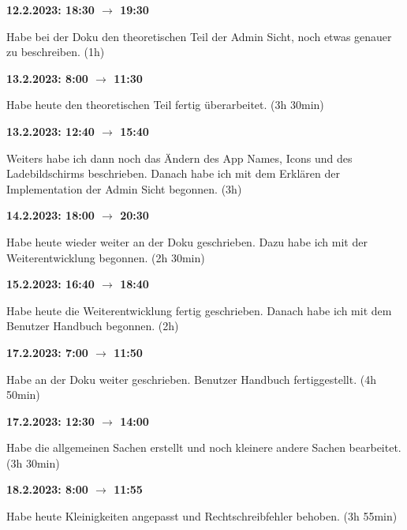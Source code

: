 \vspace{0.5cm}

\textbf{12.2.2023: 18:30 $\rightarrow$ 19:30} \

Habe bei der Doku den theoretischen Teil der Admin Sicht, noch etwas genauer zu beschreiben. (1h)

\vspace{0.5cm}

\textbf{13.2.2023: 8:00 $\rightarrow$ 11:30} \

Habe heute den theoretischen Teil fertig überarbeitet. (3h 30min)

\vspace{0.5cm}

\textbf{13.2.2023: 12:40 $\rightarrow$ 15:40} \

Weiters habe ich dann noch das Ändern des App Names, Icons und des Ladebildschirms beschrieben. Danach habe ich mit dem Erklären der Implementation der Admin Sicht begonnen. (3h)

\vspace{0.5cm}

\textbf{14.2.2023: 18:00 $\rightarrow$ 20:30} \

Habe heute wieder weiter an der Doku geschrieben. Dazu habe ich mit der Weiterentwicklung begonnen. (2h 30min)

\vspace{0.5cm}

\textbf{15.2.2023: 16:40 $\rightarrow$ 18:40} \

Habe heute die Weiterentwicklung fertig geschrieben. Danach habe ich mit dem Benutzer Handbuch begonnen. (2h)

\vspace{0.5cm}

\textbf{17.2.2023: 7:00 $\rightarrow$ 11:50} \

Habe an der Doku weiter geschrieben. Benutzer Handbuch fertiggestellt. (4h 50min)

\vspace{0.5cm}

\textbf{17.2.2023: 12:30 $\rightarrow$ 14:00} \

Habe die allgemeinen Sachen erstellt und noch kleinere andere Sachen bearbeitet. (3h 30min)

\vspace{0.5cm}

\textbf{18.2.2023: 8:00 $\rightarrow$ 11:55} \

Habe heute Kleinigkeiten angepasst und Rechtschreibfehler behoben. (3h 55min)

